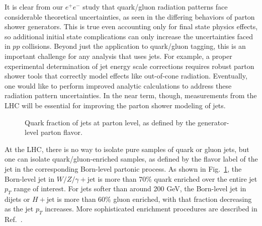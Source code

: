 \documentclass[11pt]{cernrep}
\begin{document}
It is clear from our $e^+e^-$ study that quark/gluon radiation patterns face considerable theoretical uncertainties, as seen in the differing behaviors of parton shower generators.  This is true even accounting only for final state physics effects, so additional initial state complications can only increase the uncertainties faced in $pp$ collisions.  Beyond just the application to quark/gluon tagging, this is an important challenge for any analysis that uses jets.  For example, a proper experimental determination of jet energy scale corrections requires robust parton shower tools that correctly model effects like out-of-cone radiation.  Eventually, one would like to perform improved analytic calculations to address these radiation pattern uncertainties.  In the near term, though, measurements from the LHC will be essential for improving the parton shower modeling of jets.

\begin{figure}
\centering
{}
\caption{Quark fraction of jets at parton level, as defined by the generator-level parton flavor.}
\label{quarkgluon_fig:parton_level_qg_composition}
\end{figure}

At the LHC, there is no way to isolate pure samples of quark or gluon jets, but one can isolate quark/gluon-enriched samples, as defined by the flavor label of the jet in the corresponding Born-level partonic process.  As shown in Fig.~\ref{quarkgluon_fig:parton_level_qg_composition}, the Born-level jet in $W/Z/\gamma + \text{jet}$ is more than 70\% quark enriched over the entire jet $p_T$ range of interest.  For jets softer than around 200 GeV, the Born-level jet in dijets or $H+\text{jet}$ is more than 60\% gluon enriched, with that fraction decreasing as the jet $p_T$ increases.  More sophisticated enrichment procedures are described in Ref.~\cite{Gallicchio:2011xc}.
\end{document}
